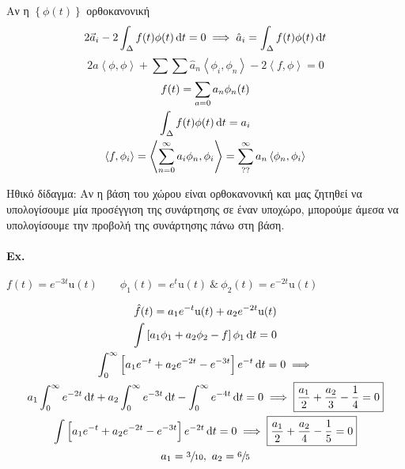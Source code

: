 \documentclass[11pt,a4paper,titlepage,fleqn]{article}
\begin{document}
    Αν η \( \left\lbrace \phi(t) \right\rbrace \) ορθοκανονική
    \begin{align*}
    2\vec a_i-2\int_\Delta f(t)\phi(t)\dif t = 0 \implies
    \hat a_i = \int_\Delta f(t)\phi(t) \dif t 
    \end{align*}\[
    2a\left\langle \phi,\phi \right\rangle +\sum\sum \hat a_n
    \left\langle \phi_i,\phi_n \right\rangle
    -2\left\langle f,\phi\right\rangle = 0
    \]
    \begin{gather*}
    f(t) = \sum_{a=0} a_n\phi_n(t)\\
    \int_\Delta f(t)\phi(t)\dif t =a_i\\
    \left\langle f,\phi_i\right\rangle = \left\langle
    \sum_{n=0}^\infty a_i\phi_n,\phi_i
    \right\rangle = \sum_{??}^\infty a_n\left\langle \phi_n,\phi_i\right\rangle
    \end{gather*}
    
    Ηθικό δίδαγμα: Αν η βάση του χώρου είναι ορθοκανονική και μας ζητηθεί να υπολογίσουμε
    μία προσέγγιση της συνάρτησης σε έναν υποχώρο, μπορούμε άμεσα να υπολογίσουμε την
    προβολή της συνάρτησης πάνω στη βάση.
    
    \paragraph{Ex.}
    \( f(t)=e^{-3t}\mathrm u(t)
    \qquad \phi_1(t)=e^t\mathrm u(t) \ \& \
    \phi_2(t) = e^{-2t}\mathrm u(t)
     \)
     
    \begin{gather*}
    \hat f(t) = a_1e^{-t}\mathrm u(t) + a_2e^{-2t}\mathrm u(t) \\
    \int \left[ a_1\phi_1+a_2\phi_2 -f \right]\phi_1\dif t = 0\\
    \int_0^\infty \left[ a_1e^{-t}+a_2e^{-2t}-e^{-3t}\right]e^{-t}\dif t = 0\implies
    \\
    a_1\int_0^\infty e^{-2t}\dif t+a_2\int_0^\infty e^{-3t}\dif t -\int_0^\infty
    e^{-4t}\dif t = 0
    \implies \boxed{ \frac{a_1}{2}+\frac{a_2}{3}-\frac{1}{4} = 0 } \\
    \int\left[ a_1e^{-t}+a_2e^{-2t}-e^{-3t} \right]e^{-2t}\dif t = 0 \implies
    \boxed{\frac{a_1}{2}+\frac{a_2}{4}-\frac{1}{5}=0}\\
    a_1 = \sfrac{3}{10},\ a_2 = \sfrac{6}{5}
    \end{gather*}

    
\end{document}

